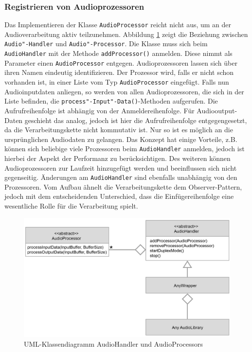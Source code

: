 \FloatBarrier
\subsubsection{Registrieren von Audioprozessoren}
Das Implementieren der Klasse \texttt{AudioProcessor} reicht nicht aus, um an der Audioverarbeitung aktiv teilzunehmen. Abbildung \ref{Fig:AudioHandlerAudioProcessor} zeigt die Beziehung zwischen \texttt{Audio"-Handler} und \texttt{Audio"-Processor}. Die Klasse muss sich beim \texttt{AudioHandler} mit der Methode \texttt{addProcessor()} anmelden. Diese nimmt als Parameter einen \texttt{AudioProcessor} entgegen. Audioprozessoren lassen sich über ihren Namen eindeutig identifizieren. Der Prozessor wird, falls er nicht schon vorhanden ist, in einer Liste vom Typ \texttt{AudioProcessor} eingefügt. Falls nun Audioinputdaten anliegen, so werden von allen Audioprozessoren, die sich in der Liste befinden, die \texttt{process"-Input"-Data()}-Methoden aufgerufen. Die Aufrufreihenfolge ist abhängig von der Anmeldereihenfolge. Für Audiooutput-Daten geschieht das analog, jedoch ist hier die Aufrufreihenfolge entgegengesetzt, da die Verarbeitungskette nicht kommutativ ist. Nur so ist es möglich an die ursprünglichen Audiodaten zu gelangen. Das Konzept hat einige Vorteile, z.B. können sich beliebige viele Prozessoren beim \texttt{AudioHandler} anmelden, jedoch ist hierbei der Aspekt der Performanz zu berücksichtigen. Des weiteren können Audioprozessoren zur Laufzeit hinzugefügt werden und beeinflussen sich nicht gegenseitig. Änderungen am \texttt{AudioHandler} sind ebenfalls unabhängig von den Prozessoren.
Vom Aufbau ähnelt die Verarbeitungskette dem Observer-Pattern, jedoch mit dem entscheidenden Unterschied, dass die Einfügereihenfolge eine wesentliche Rolle für die Verarbeitung spielt. 
\newline
\begin{figure}[htp]
\centering
\includegraphics[width=1\textwidth]{../img/AudioHandlerAudioProcessor}
\caption{UML-Klassendiagramm AudioHandler und AudioProcessors}
\label{Fig:AudioHandlerAudioProcessor}
\end{figure}

